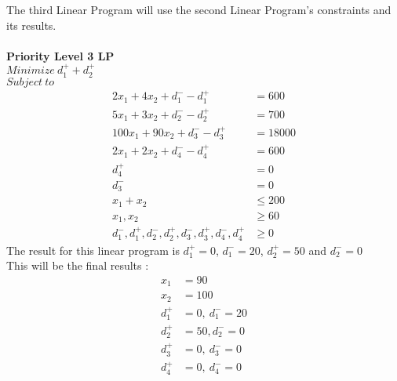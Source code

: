 \documentclass[twoside,twocolumn]{article}
\begin{document}
The third Linear Program will use the second Linear Program's constraints and its results. \\
\\
\textbf{Priority Level 3 LP}\\
$Minimize \ d_1^{+} + d_2^{+}$ \\
$Subject \ to$
\begin{align*}
2x_1 + 4x_2 + d_1^{-} - d_1^{+} &= 600\\
5x_1 + 3x_2 + d_2^{-} - d_2^{+} &= 700\\
100x_1 + 90x_2 + d_3^{-} - d_3^{+} &= 18000\\
2x_1 + 2x_2 + d_4^{-} - d_4^{+} &= 600 \\
d_4^{+} &= 0 \\
d_3^{-} &= 0  \\
x_1 + x_2 &\leq 200 \\
x_1, x_2 &\geq 60 \\
d_1^{-}, d_1^{+}, d_2^{-}, d_2^{+}, d_3^{-}, d_3^{+}, d_4^{-}, d_4^{+} &\geq 0 
\end{align*}
The result for this linear program is $d_1^{+} = 0$, $d_1^{-} = 20$, $d_2^{+} = 50$ and $d_2^{-} = 0$ \\

This will be the final results :
\begin{align*}
x_1 &= 90 \\
x_2 &= 100 \\
d_1^{+} &= 0, \ d_1^{-} = 20 \\
d_2^{+} &= 50, d_2^{-} = 0 \\
d_3^{+} &= 0, \ d_3^{-} = 0 \\
d_4^{+} &= 0, \ d_4^{-} = 0 
\end{align*}
\end{document}
